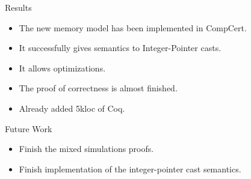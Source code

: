 \begin{frame}{\secname}

  \begin{exampleblock}{Results}
    \begin{itemize}
    \item The new memory model has been implemented in CompCert.
    \item It successfully gives semantics to Integer-Pointer casts.
    \item It allows optimizations.
    \item The proof of correctness is almost finished.
    \item Already added 5kloc of Coq.
    \end{itemize}
  \end{exampleblock}
  \vfill
  \begin{block}{Future Work}
    \begin{itemize}
    \item Finish the mixed simulations proofs.
    \item Finish implementation of the integer-pointer cast semantics.
    \end{itemize}
  \end{block}
  
\end{frame}
